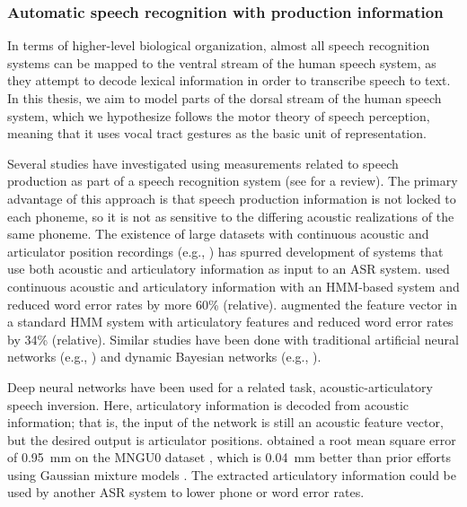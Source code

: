 \subsubsection{Automatic speech recognition with production information}
\label{sec:asr-prod}

In terms of higher-level biological organization,
almost all speech recognition systems
can be mapped
to the ventral stream of the human speech system,
as they attempt to decode
lexical information in order to
transcribe speech to text.
In this thesis, we aim to model
parts of the dorsal stream of the human speech system,
which we hypothesize follows the
motor theory of speech perception,
meaning that it uses vocal tract gestures
as the basic unit of representation.

Several studies have investigated
using measurements
related to speech production
as part of a speech recognition system
(see \citealt{king2007} for a review).
The primary advantage of this approach
is that speech production information
is not locked to each phoneme,
so it is not as sensitive to the
differing acoustic realizations
of the same phoneme.
The existence of large datasets
with continuous acoustic
and articulator position recordings
(e.g., \citealt{westbury1990,wrench2000,steiner2012})
has spurred development of
systems that use both
acoustic and articulatory information
as input to an ASR system.
\citet{zlokarnik1995}
used continuous acoustic and articulatory
information with an HMM-based system
and reduced word error rates
by more 60\% (relative).
\citet{eide2001}
augmented the feature vector
in a standard HMM system
with articulatory features and
reduced word error rates
by 34\% (relative).
Similar studies have been done
with traditional artificial neural networks
(e.g., \citealt{kirchhoff2002})
and dynamic Bayesian networks
(e.g., \citealt{stephenson2000,stephenson2004}).

Deep neural networks have been used for
a related task,
acoustic-articulatory speech inversion.
Here, articulatory information
is decoded from acoustic information;
that is, the input of the network
is still an acoustic feature vector,
but the desired output
is articulator positions.
\citet{uria2011}
obtained a root mean square error
of 0.95~mm on the MNGU0 dataset
\citep{steiner2012},
which is 0.04~mm better than prior
efforts using Gaussian mixture models
\citep{richmond2009}.
The extracted articulatory information
could be used by another ASR system
to lower phone or word error rates.

